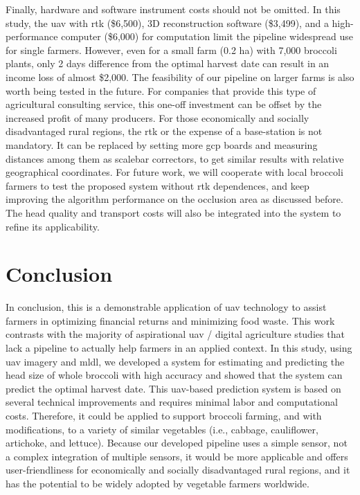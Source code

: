 Finally, hardware and software instrument costs should not be omitted. In this study, the \gls{uav} with \gls{rtk} (\$6,500), 3D reconstruction software (\$3,499), and a high-performance computer (\$6,000) for computation limit the pipeline widespread use for single farmers. However, even for a small farm (0.2 ha) with 7,000 broccoli plants, only 2 days difference from the optimal harvest date can result in an income loss of almost \$2,000. The feasibility of our pipeline on larger farms is also worth being tested in the future. For companies that provide this type of agricultural consulting service, this one-off investment can be offset by the increased profit of many producers. For those economically and socially disadvantaged rural regions, the \gls{rtk} or the expense of a base-station is not mandatory. It can be replaced by setting more \gls{gcp} boards and measuring distances among them as scalebar correctors, to get similar results with relative geographical coordinates. For future work, we will cooperate with local broccoli farmers to test the proposed system without \gls{rtk} dependences, and keep improving the algorithm performance on the occlusion area as discussed before. The head quality and transport costs will also be integrated into the system to refine its applicability.

\section{Conclusion}

In conclusion, this is a demonstrable application of \gls{uav} technology to assist farmers in optimizing financial returns and minimizing food waste. This work contrasts with the majority of aspirational \gls{uav} / digital agriculture studies that lack a pipeline to actually help farmers in an applied context. In this study, using \gls{uav} imagery and \gls{mldl}, we developed a system for estimating and predicting the head size of whole broccoli with high accuracy and showed that the system can predict the optimal harvest date. This \gls{uav}-based prediction system is based on several technical improvements and requires minimal labor and computational costs. Therefore, it could be applied to support broccoli farming, and with modifications, to a variety of similar vegetables (i.e., cabbage, cauliflower, artichoke, and lettuce). Because our developed pipeline uses a simple sensor, not a complex integration of multiple sensors, it would be more applicable and offers user-friendliness for economically and socially disadvantaged rural regions, and it has the potential to be widely adopted by vegetable farmers worldwide.


